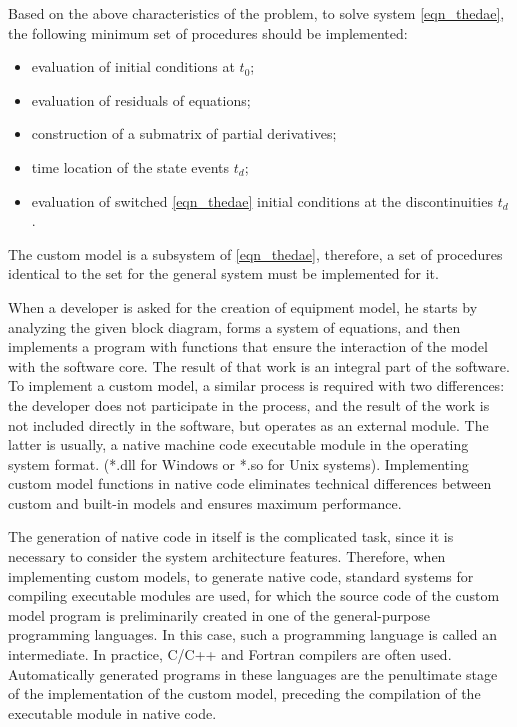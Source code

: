 \documentclass[lettersize,journal]{IEEEtran}
\begin{document}
Based on the above characteristics of the problem, to solve system \eqref{eqn_thedae}, the following minimum set of procedures should be implemented:
\begin{itemize}
	\item evaluation of initial conditions at \(t_0\);
	\item evaluation of residuals of equations;
	\item construction of a submatrix of partial derivatives;
	\item time location of the state events \(t_d\);
	\item evaluation of switched \eqref{eqn_thedae} initial conditions at the discontinuities \(t_d\).
\end{itemize}

The custom model is a subsystem of \eqref{eqn_thedae}, therefore, a set of procedures identical to the set for the general system must be implemented for it.

When a developer is asked for the creation of equipment model, he starts by analyzing the given block diagram, forms a system of equations, and then implements 
a program with functions that ensure the interaction of the model with the software core. The result of that work is an integral part of the software. 
To implement a custom model, a similar process is required with two differences: the developer does not participate in the process, and the result of the work 
is not included directly in the software, but operates as an external module. The latter is usually, a native machine code executable module in the operating system format.
(*.dll for Windows or *.so for Unix systems). Implementing custom model functions in native code eliminates technical differences between custom and 
built-in models and ensures maximum performance.

The generation of native code in itself is the complicated task, since it is necessary to consider the system architecture features.
Therefore, when implementing custom models, to generate native code, standard systems for compiling executable modules are used, 
for which the source code of the custom model program is preliminarily created in one of the general-purpose programming languages. 
In this case, such a programming language is called an intermediate. In practice, C/C++ and Fortran compilers are often used. 
Automatically generated programs in these languages are the penultimate stage of the implementation of the custom model, 
preceding the compilation of the executable module in native code.
\end{document}
